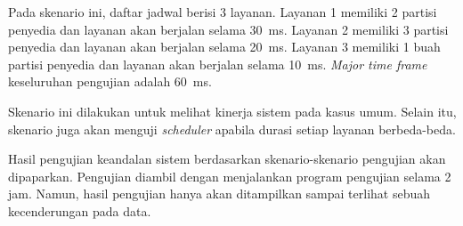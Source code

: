 \begin{enumerate}
		Pada skenario ini, daftar jadwal berisi 3 layanan. Layanan 1 memiliki 2 partisi
		penyedia dan layanan akan berjalan selama \SI{30}{\milli\second}. Layanan 2
		memiliki 3 partisi penyedia dan layanan akan berjalan selama
		\SI{20}{\milli\second}. Layanan 3 memiliki 1 buah partisi penyedia dan layanan
		akan berjalan selama \SI{10}{\milli\second}. \textit{Major time frame}
		keseluruhan pengujian adalah \SI{60}{\milli\second}.  

		Skenario ini dilakukan untuk melihat kinerja sistem pada kasus umum. Selain itu,
		skenario juga akan menguji \textit{scheduler} apabila durasi setiap layanan
		berbeda-beda.

\end{enumerate}

Hasil pengujian keandalan sistem berdasarkan skenario-skenario pengujian akan dipaparkan.
Pengujian diambil dengan menjalankan program pengujian selama 2 jam. Namun, hasil pengujian
hanya akan ditampilkan sampai terlihat sebuah kecenderungan pada data.

